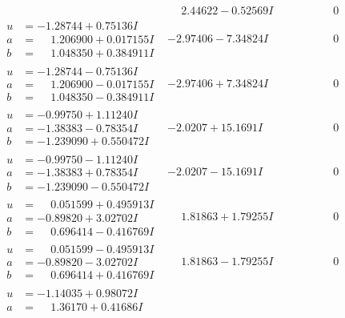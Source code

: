 \documentclass[1p]{elsarticle_modified}
\theoremstyle{definition}
\begin{document}
$$\begin{array}{c|c|c}
 & \phantom{-}2.44622 - 0.52569 I & \phantom{-0.000000 } 0 \\ \hline\begin{aligned}
u &= -1.28744 + 0.75136 I \\
a &= \phantom{-}1.206900 + 0.017155 I \\
b &= \phantom{-}1.048350 + 0.384911 I\end{aligned}
 & -2.97406 - 7.34824 I & \phantom{-0.000000 } 0 \\ \hline\begin{aligned}
u &= -1.28744 - 0.75136 I \\
a &= \phantom{-}1.206900 - 0.017155 I \\
b &= \phantom{-}1.048350 - 0.384911 I\end{aligned}
 & -2.97406 + 7.34824 I & \phantom{-0.000000 } 0 \\ \hline\begin{aligned}
u &= -0.99750 + 1.11240 I \\
a &= -1.38383 - 0.78354 I \\
b &= -1.239090 + 0.550472 I\end{aligned}
 & -2.0207 + 15.1691 I & \phantom{-0.000000 } 0 \\ \hline\begin{aligned}
u &= -0.99750 - 1.11240 I \\
a &= -1.38383 + 0.78354 I \\
b &= -1.239090 - 0.550472 I\end{aligned}
 & -2.0207 - 15.1691 I & \phantom{-0.000000 } 0 \\ \hline\begin{aligned}
u &= \phantom{-}0.051599 + 0.495913 I \\
a &= -0.89820 + 3.02702 I \\
b &= \phantom{-}0.696414 - 0.416769 I\end{aligned}
 & \phantom{-}1.81863 + 1.79255 I & \phantom{-0.000000 } 0 \\ \hline\begin{aligned}
u &= \phantom{-}0.051599 - 0.495913 I \\
a &= -0.89820 - 3.02702 I \\
b &= \phantom{-}0.696414 + 0.416769 I\end{aligned}
 & \phantom{-}1.81863 - 1.79255 I & \phantom{-0.000000 } 0 \\ \hline\begin{aligned}
u &= -1.14035 + 0.98072 I \\
a &= \phantom{-}1.36170 + 0.41686 I \\

\end{aligned}
\end{array}$$
\end{document}

